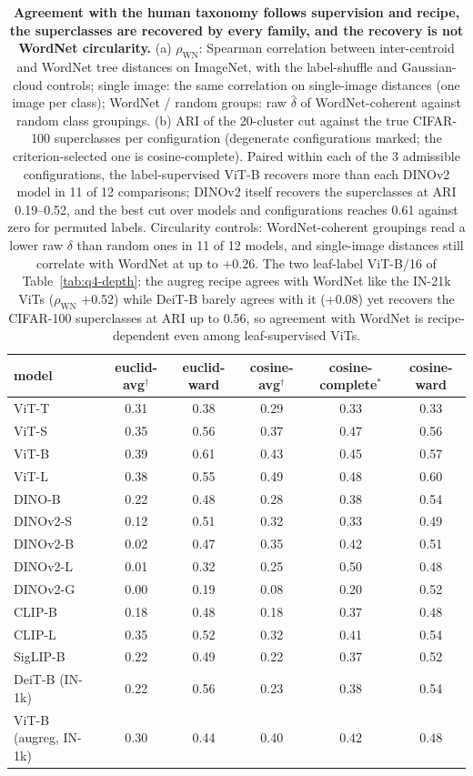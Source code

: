 \begin{table}[H]
\footnotesize
\setlength{\tabcolsep}{4pt}
\begin{tabular}{lccccc}
\toprule
model & euclid-avg$^{\dagger}$ & euclid-ward & cosine-avg$^{\dagger}$ & cosine-complete$^{*}$ & cosine-ward \\
\midrule
ViT-T & 0.31 & 0.38 & 0.29 & 0.33 & 0.33 \\
ViT-S & 0.35 & 0.56 & 0.37 & 0.47 & 0.56 \\
ViT-B & 0.39 & 0.61 & 0.43 & 0.45 & 0.57 \\
ViT-L & 0.38 & 0.55 & 0.49 & 0.48 & 0.60 \\
\midrule
DINO-B & 0.22 & 0.48 & 0.28 & 0.38 & 0.54 \\
DINOv2-S & 0.12 & 0.51 & 0.32 & 0.33 & 0.49 \\
DINOv2-B & 0.02 & 0.47 & 0.35 & 0.42 & 0.51 \\
DINOv2-L & 0.01 & 0.32 & 0.25 & 0.50 & 0.48 \\
DINOv2-G & 0.00 & 0.19 & 0.08 & 0.20 & 0.52 \\
\midrule
CLIP-B & 0.18 & 0.48 & 0.18 & 0.37 & 0.48 \\
CLIP-L & 0.35 & 0.52 & 0.32 & 0.41 & 0.54 \\
SigLIP-B & 0.22 & 0.49 & 0.22 & 0.37 & 0.52 \\
\midrule
DeiT-B (IN-1k) & 0.22 & 0.56 & 0.23 & 0.38 & 0.54 \\
ViT-B (augreg, IN-1k) & 0.30 & 0.44 & 0.40 & 0.42 & 0.48 \\
\bottomrule
\end{tabular}
\par\vspace{5pt}
\endgroup
\caption{\textbf{Agreement with the human taxonomy follows supervision and recipe, the superclasses are recovered by every family, and the recovery is not WordNet circularity.} (a) $\rho_{\text{WN}}$: Spearman correlation between inter-centroid and WordNet tree distances on ImageNet, with the label-shuffle and Gaussian-cloud controls; single image: the same correlation on single-image distances (one image per class); WordNet / random groups: raw $\hat\delta$ of WordNet-coherent against random class groupings. (b) ARI of the 20-cluster cut against the true CIFAR-100 superclasses per configuration (degenerate configurations marked; the criterion-selected one is cosine-complete). Paired within each of the 3 admissible configurations, the label-supervised ViT-B recovers more than each DINOv2 model in 11 of 12 comparisons; DINOv2 itself recovers the superclasses at ARI 0.19--0.52, and the best cut over models and configurations reaches 0.61 against zero for permuted labels. Circularity controls: WordNet-coherent groupings read a lower raw $\delta$ than random ones in 11 of 12 models, and single-image distances still correlate with WordNet at up to $+0.26$. The two leaf-label ViT-B/16 of Table~\ref{tab:q4-depth}: the augreg recipe agrees with WordNet like the IN-21k ViTs ($\rho_{\text{WN}}$ +0.52) while DeiT-B barely agrees with it (+0.08) yet recovers the CIFAR-100 superclasses at ARI up to 0.56, so agreement with WordNet is recipe-dependent even among leaf-supervised ViTs. %
}
\end{table}
